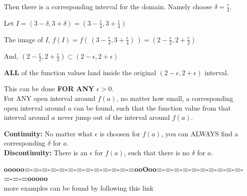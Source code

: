 \documentclass{ximera}
\begin{document}
\begin{example}
\begin{explanation}
Then there is a corresponding interval for the domain. Namely choose $\delta = \frac{\epsilon}{4}$.

Let $I = (3 - \delta, 3 + \delta) = \left(3 - \frac{\epsilon}{4}, 3 + \frac{\epsilon}{4}\right)$


The image of $I$, $f(I) = f\left(\,\left(3 - \frac{\epsilon}{4}, 3 + \frac{\epsilon}{4}\right)\,\right) = \left(2 - \frac{\epsilon}{2}, 2 + \frac{\epsilon}{2}\right)$

And, $\left(2 - \frac{\epsilon}{2}, 2 + \frac{\epsilon}{2}\right) \subset  (2 - \epsilon, 2 + \epsilon) $


\textbf{ALL} of the function values land inside the original $(2 - \epsilon, 2 + \epsilon)$ interval.


This can be done \textbf{\textcolor{red!80!black}{FOR ANY}} $\epsilon > 0$. \\


For ANY open interval around $f(a)$, no matter how small, a corresponding open interval around $a$ can be found, such that the function value from that interval around $a$ never jump out of the interval around $f(a)$.










\end{explanation}
\end{example}





\textbf{Continuity:} No matter what $\epsilon$ is choosen for $f(a)$, you can ALWAYS find a corresponding $\delta$ for $a$. \\



\textbf{Discontinuity:} There is an $\epsilon$ for $f(a)$, such that there is no $\delta$ for $a$. \\

























\begin{center}
\textbf{\textcolor{green!50!black}{ooooo=-=-=-=-=-=-=-=-=-=-=-=-=ooOoo=-=-=-=-=-=-=-=-=-=-=-=-=ooooo}} \\

more examples can be found by following this link\\ 

\end{center}
\end{document}
